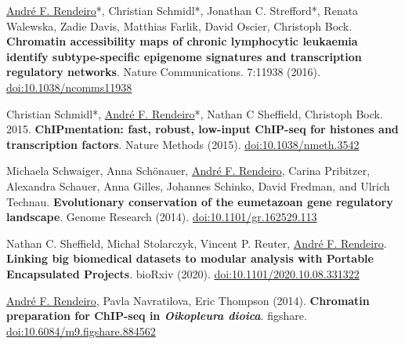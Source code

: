 \documentclass[11pt,a4paper,roman]{moderncv} %
\begin{document}
\begin{etaremune}[leftmargin=1.0cm, itemindent=0pt, topsep=10pt, itemsep=2pt, partopsep=0pt, parsep=0pt]
        \item \underline{André F. Rendeiro}*, Christian Schmidl*, Jonathan C. Strefford*, Renata Walewska, Zadie Davis, Matthias Farlik, David Oscier, Christoph Bock. \textbf{Chromatin accessibility maps of chronic lymphocytic leukaemia identify subtype-specific epigenome signatures and transcription regulatory networks}. Nature Communications. 7:11938 (2016).
        \href{https://dx.doi.org/10.1038/ncomms11938}{doi:10.1038/ncomms11938}

        \item Christian Schmidl*, \underline{André F. Rendeiro}*,  Nathan C Sheffield, Christoph Bock. 2015. \textbf{ChIPmentation: fast, robust, low-input ChIP-seq for histones and transcription factors}. Nature Methods (2015).
        \href{https://dx.doi.org/10.1038/nmeth.3542}{doi:10.1038/nmeth.3542}

        \item Michaela Schwaiger, Anna Schönauer, \underline{André F. Rendeiro}, Carina Pribitzer, Alexandra Schauer, Anna Gilles, Johannes Schinko, David Fredman, and Ulrich Technau. \textbf{Evolutionary conservation of the eumetazoan gene regulatory landscape}. Genome Research (2014).
        \href{https://dx.doi.org/10.1101/gr.162529.113}{doi:10.1101/gr.162529.113}

        \end{etaremune}

        \begin{etaremune}[leftmargin=1.0cm, itemindent=0pt, topsep=10pt, itemsep=2pt, partopsep=0pt, parsep=0pt]

        \item Nathan C. Sheffield, Michał Stolarczyk, Vincent P. Reuter, \underline{André F. Rendeiro}. \textbf{Linking big biomedical datasets to modular analysis with Portable Encapsulated Projects}. bioRxiv (2020). \href{https://dx.doi.org/10.1101/2020.10.08.331322}{doi:10.1101/2020.10.08.331322}

        \item \underline{André F. Rendeiro}, Pavla  Navratilova, Eric Thompson (2014). \textbf{Chromatin preparation for ChIP-seq in \textit{Oikopleura dioica}}. figshare. \href{https://doi.org/10.6084/m9.figshare.884562}{doi:10.6084/m9.figshare.884562}
        \end{etaremune}
\end{document}
